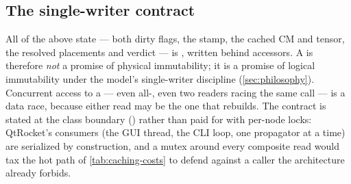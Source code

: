 
\subsection{The single-writer contract}\label{sec:caching-singlewriter}

All of the above state --- both dirty flags, the stamp, the cached CM and tensor, the resolved
placements and verdict --- is , written behind  accessors. A
 is therefore \emph{not} a promise of physical immutability; it is a
promise of logical immutability under the model's single-writer discipline
(\cref{sec:philosophy}). Concurrent access to a  --- even all-,
even two readers racing the same  call --- is a data race, because either
read may be the one that rebuilds. The contract is stated at the class boundary
() rather than paid for with per-node locks: QtRocket's
consumers (the GUI thread, the CLI loop, one propagator at a time) are serialized by
construction, and a mutex around every composite read would tax the hot path of
\cref{tab:caching-costs} to defend against a caller the architecture already forbids.
